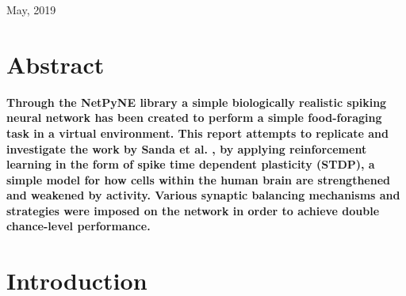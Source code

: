 \documentclass[11pt, twocolumn]{article}
\begin{document}
\begin{titlepage}
		
		\vfill\vfill\vfill %
		
		{\large May, 2019} %
		
		
		
		
		\vfill %
		
	\end{titlepage}

\newpage
\twocolumn

\section*{Abstract}
\textbf{Through the \acs{NetPyNE} library a simple biologically realistic spiking neural network has been created to perform a simple food-foraging task in a virtual environment. This report attempts to replicate and investigate the work by Sanda et al. \cite{sanda2017multi}, by applying reinforcement learning in the form of spike time dependent plasticity (\acs{STDP}), a simple model for how cells within the human brain are strengthened and weakened by activity. Various synaptic balancing mechanisms and strategies were imposed on the network in order to achieve double chance-level performance.}

\section*{Introduction}
\end{document}
